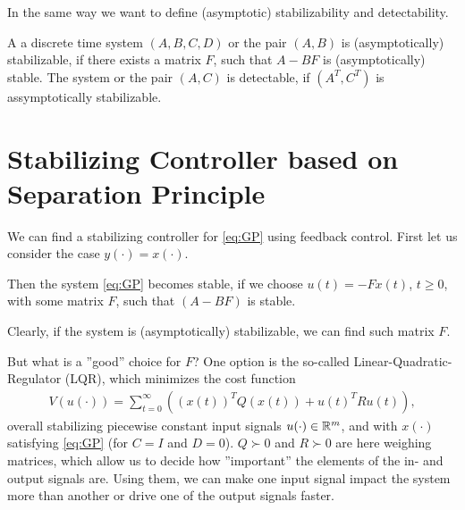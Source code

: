 In the same way we want to define (asymptotic) stabilizability and detectability. 
\begin{defi}
A a discrete time system $(A, B, C, D)$ or the pair $(A, B)$ is (asymptotically) stabilizable, if there exists a matrix $F$, such that $A - BF$ is (asymptotically) stable.
The system or the pair $(A,C)$ is detectable, if $(A^T, C^T)$ is assymptotically stabilizable. 
\end{defi}



\section{Stabilizing Controller based on Separation Principle}
\label{sch:stabilizingController}



We can find a stabilizing controller for \eqref{eq:GP} using feedback control.
First let us consider the case $y(\cdot) = x(\cdot)$.

%
%

Then the system \eqref{eq:GP} becomes stable, if we choose $u(t) = -Fx(t)$, $t \geq 0$, with some matrix $F$, such that $(A - BF)$ is stable.

Clearly, if the system is (asymptotically) stabilizable, we can find such matrix $F$. 

But what is a ''good'' choice for $F$? One option is the so-called Linear-Quadratic-Regulator (LQR), which minimizes the cost function 
\begin{align}
\label{eq:costFcn}
V(u(\cdot)) = \sum_{t = 0}^\infty \left( (x(t))^T Q (x(t)) + u(t)^T R u(t)\right),
\end{align}
overall stabilizing piecewise constant input signals $u(\cdot) \in {\mathbb{R}}^m$, and with $x(\cdot)$ satisfying \eqref{eq:GP} (for $C = I$ and $D = 0$). 
$Q \succ 0$ and $R \succ 0$ are here weighing matrices, which allow us to decide how ''important'' the elements of the in- and output signals are.  
Using them, we can make one input signal impact the system more than another or drive one of the output signals faster. 

